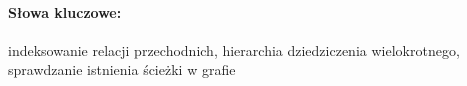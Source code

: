 
\paragraph{Słowa kluczowe:} indeksowanie relacji przechodnich, hierarchia dziedziczenia wielokrotnego, sprawdzanie
istnienia ścieżki w grafie

